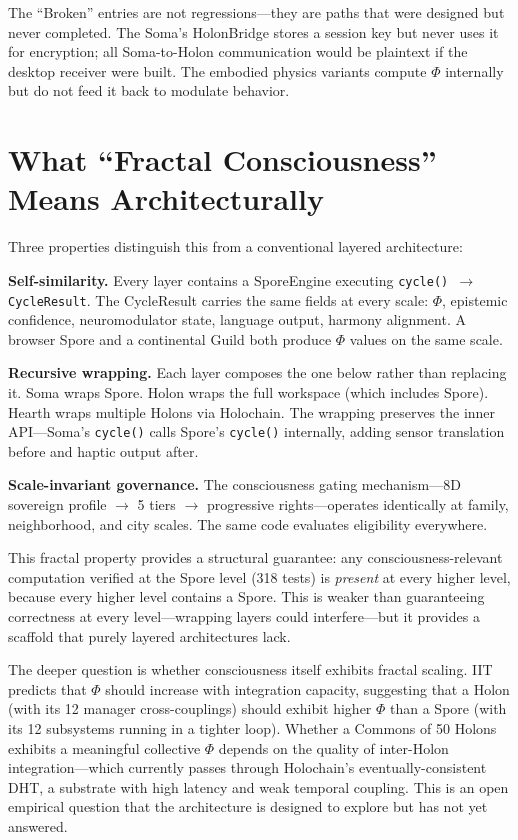 \documentclass[12pt]{book}
\begin{document}
The ``Broken'' entries are not regressions---they are paths that were designed but never completed. The Soma's HolonBridge stores a session key but never uses it for encryption; all Soma-to-Holon communication would be plaintext if the desktop receiver were built. The embodied physics variants compute $\Phi$ internally but do not feed it back to modulate behavior.

\section{What ``Fractal Consciousness'' Means Architecturally}

Three properties distinguish this from a conventional layered architecture:

\textbf{Self-similarity.} Every layer contains a SporeEngine executing \texttt{cycle() $\to$ CycleResult}. The CycleResult carries the same fields at every scale: $\Phi$, epistemic confidence, neuromodulator state, language output, harmony alignment. A browser Spore and a continental Guild both produce $\Phi$ values on the same scale.

\textbf{Recursive wrapping.} Each layer composes the one below rather than replacing it. Soma wraps Spore. Holon wraps the full workspace (which includes Spore). Hearth wraps multiple Holons via Holochain. The wrapping preserves the inner API---Soma's \texttt{cycle()} calls Spore's \texttt{cycle()} internally, adding sensor translation before and haptic output after.

\textbf{Scale-invariant governance.} The consciousness gating mechanism---8D sovereign profile $\to$ 5 tiers $\to$ progressive rights---operates identically at family, neighborhood, and city scales. The same code evaluates eligibility everywhere.

This fractal property provides a structural guarantee: any consciousness-relevant computation verified at the Spore level (318 tests) is \textit{present} at every higher level, because every higher level contains a Spore. This is weaker than guaranteeing correctness at every level---wrapping layers could interfere---but it provides a scaffold that purely layered architectures lack.

The deeper question is whether consciousness itself exhibits fractal scaling. IIT predicts that $\Phi$ should increase with integration capacity, suggesting that a Holon (with its 12 manager cross-couplings) should exhibit higher $\Phi$ than a Spore (with its 12 subsystems running in a tighter loop). Whether a Commons of 50 Holons exhibits a meaningful collective $\Phi$ depends on the quality of inter-Holon integration---which currently passes through Holochain's eventually-consistent DHT, a substrate with high latency and weak temporal coupling. This is an open empirical question that the architecture is designed to explore but has not yet answered.
\end{document}
